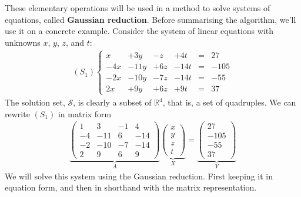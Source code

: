 These elementary operations will be used in a method to solve systems of equations, called \textbf{Gaussian reduction}. Before summarising the algorithm, we'll use it on a concrete example. Consider the system of linear equations with unknowns $x$, $y$, $z$, and $t$:
\begin{align*}
(S_1)
\left\{
\begin{matrix}
    x &+  3y &-  z &+  4t &=&   27 \\
  -4x &- 11y &+ 6z &- 14t &=& -105 \\
  -2x &- 10y &- 7z &- 14t &=&  -55 \\
   2x &+  9y &+ 6z &+  9t &=&   37
\end{matrix}
\right.
\end{align*}
The solution set, $\mathcal{S}$, is clearly a subset of $\mathbb{R}^4$, that is, a set of quadruples. We can rewrite $(S_1)$ in matrix form
\begin{align*}
\underbrace{
\begin{pmatrix}
   1 &   3 & -1 &   4 \\
  -4 & -11 &  6 & -14 \\
  -2 & -10 & -7 & -14 \\
   2 &   9 &  6 &   9
\end{pmatrix}}_A
\underbrace{
\begin{pmatrix}
x \\
y \\
z \\
t
\end{pmatrix}}_X
=
\underbrace{
\begin{pmatrix}
27 \\
-105 \\
-55 \\
37
\end{pmatrix}}_Y
\end{align*}
We will solve this system using the Gaussian reduction. First keeping it in equation form, and then in shorthand with the matrix representation.

